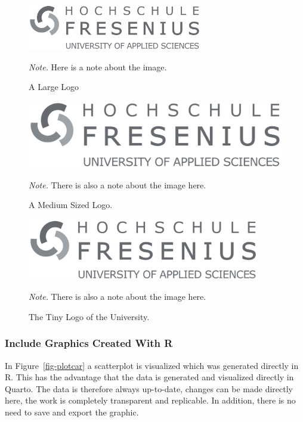 \documentclass[
  stu,
  floatsintext,
  longtable,
  a4paper,
  nolmodern,
  notxfonts,
  notimes,
  colorlinks=true,linkcolor=black,citecolor=black,urlcolor=black]{apa7}
\begin{document}
\begin{figure}[t]

{\caption{{A Large Logo}{\label{fig-logo}}}}

\includegraphics[width=3in,height=\textheight,keepaspectratio]{logo.png}

\noindent \emph{Note.} Here is a note about the image.

\end{figure}

\begin{figure}[t]

\caption{\label{fig-logo2}A Medium Sized Logo.}

\includegraphics[width=0.3\linewidth,height=\textheight,keepaspectratio]{logo.png}

\emph{Note.} There is also a note about the image here.

\end{figure}%

\begin{figure}[t]

{\caption{{The Tiny Logo of the University.}{\label{fig-logo3}}}}

\includegraphics[width=4in,height=\textheight,keepaspectratio]{logo.png}

\noindent \emph{Note.} There is also a note about the image here.

\end{figure}

\subsubsection{Include Graphics Created With
R}\label{include-graphics-created-with-r}

In Figure~\ref{fig-plotcar} a scatterplot is visualized which was
generated directly in R. This has the advantage that the data is
generated and visualized directly in Quarto. The data is therefore
always up-to-date, changes can be made directly here, the work is
completely transparent and replicable. In addition, there is no need to
save and export the graphic.
\end{document}
